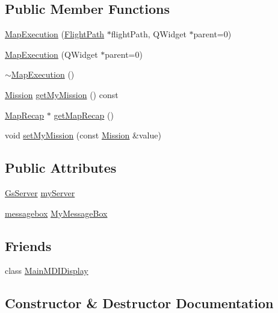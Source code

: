 \subsection*{Public Member Functions}
\begin{DoxyCompactItemize}
\item 
\hyperlink{class_map_execution_afcf6d9187674478b9b24cdb59b832198}{Map\+Execution} (\hyperlink{class_flight_path}{Flight\+Path} $\ast$flight\+Path, Q\+Widget $\ast$parent=0)
\item 
\hyperlink{class_map_execution_a8cd67a89386d7880f2f741598f78115c}{Map\+Execution} (Q\+Widget $\ast$parent=0)
\item 
\hyperlink{class_map_execution_aeaebbbd5ed4a669c28b9b2372a135e9c}{$\sim$\+Map\+Execution} ()
\item 
\hyperlink{class_mission}{Mission} \hyperlink{class_map_execution_ab96a28f3c2d98931c94e25cd4d059262}{get\+My\+Mission} () const 
\item 
\hyperlink{class_map_recap}{Map\+Recap} $\ast$ \hyperlink{class_map_execution_a44b75a52f37d3a0487651e75c79aea2a}{get\+Map\+Recap} ()
\item 
void \hyperlink{class_map_execution_a41eefdc4c0f8c8bec18b11f3eb55f91b}{set\+My\+Mission} (const \hyperlink{class_mission}{Mission} \&value)
\end{DoxyCompactItemize}
\subsection*{Public Attributes}
\begin{DoxyCompactItemize}
\item 
\hyperlink{class_gs_server}{Gs\+Server} \hyperlink{class_map_execution_a9cbfe92cbfe0fe7ee433a04a121be766}{my\+Server}
\item 
\hyperlink{classmessagebox}{messagebox} \hyperlink{class_map_execution_ade1432547d600a40172f5f00e4db3a1e}{My\+Message\+Box}
\end{DoxyCompactItemize}
\subsection*{Friends}
\begin{DoxyCompactItemize}
\item 
class \hyperlink{class_map_execution_a337398c114f638b5a3e2fdc4529936c5}{Main\+M\+D\+I\+Display}
\end{DoxyCompactItemize}


\subsection{Constructor \& Destructor Documentation}
\hypertarget{class_map_execution_afcf6d9187674478b9b24cdb59b832198}{}
